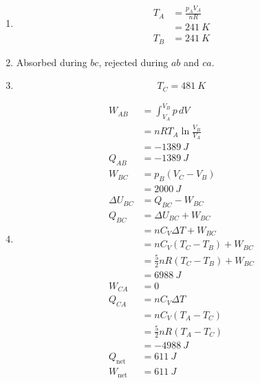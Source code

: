 \documentclass{article}
\begin{document}
\setcounter{subsubsection}{36}
\subsubsection{}

\begin{enumerate}
  \item

        \begin{align*}
          T_A & = \frac{p_A V_A}{n R} \\
              & = \qty{241}{K}        \\
          T_B & = \qty{241}{K}
        \end{align*}

  \item Absorbed during $b c$, rejected during $a b$ and $c a$.

  \item \[T_C = \qty{481}{K}\]

  \item

        \begin{align*}
          W_{AB}        & = \int_{V_A}^{V_B} p \,d V             \\
                        & = n R T_A \ln \frac{V_B}{V_A}          \\
                        & = \qty{-1389}{J}                       \\
          Q_{AB}        & = \qty{-1389}{J}                       \\
          W_{BC}        & = p_B (V_C - V_B)                      \\
                        & = \qty{2000}{J}                        \\
          \Delta U_{BC} & = Q_{BC} - W_{BC}                      \\
          Q_{BC}        & = \Delta U_{BC} + W_{BC}               \\
                        & = n C_V \Delta T + W_{BC}              \\
                        & = n C_V (T_C - T_B) + W_{BC}           \\
                        & = \frac{5}{2} n R (T_C - T_B) + W_{BC} \\
                        & = \qty{6988}{J}                        \\
          W_{CA}        & = 0                                    \\
          Q_{CA}        & = n C_V \Delta T                       \\
                        & = n C_V (T_A - T_C)                    \\
                        & = \frac{5}{2} n R (T_A - T_C)          \\
                        & = \qty{-4988}{J}                       \\
          Q_\text{net}  & = \qty{611}{J}                         \\
          W_\text{net}  & = \qty{611}{J}
        \end{align*}


\end{enumerate}
\end{document}
